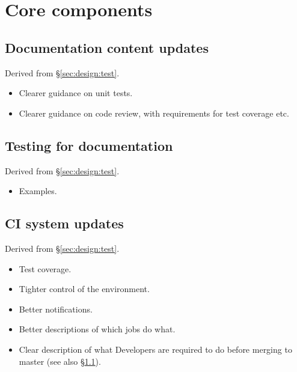\section{Core components}
\label{sec:comp}







\subsection{Documentation content updates}
\label{sec:comp:doc}

Derived from \S\ref{sec:design:test}.


\begin{itemize}

  \item{Clearer guidance on unit tests.}
  \item{Clearer guidance on code review, with requirements for test coverage
  etc.}

\end{itemize}

\subsection{Testing for documentation}
\label{sec:comp:doctest}

Derived from \S\ref{sec:design:test}.


\begin{itemize}

  \item{Examples.}

\end{itemize}

\subsection{CI system updates}
\label{sec:comp:ci}

Derived from \S\ref{sec:design:test}.


\begin{itemize}

  \item{Test coverage.}
  \item{Tighter control of the environment.}
  \item{Better notifications.}
  \item{Better descriptions of which jobs do what.}
  \item{Clear description of what Developers are required to do before merging
  to master (see also \S\ref{sec:comp:doc}).}

\end{itemize}






